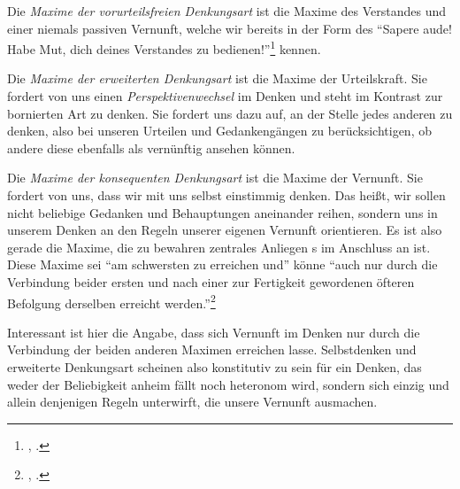 \begin{nummerierung}
 \item Die \emph{Maxime der vorurteilsfreien Denkungsart} ist die Maxime des
 Verstandes und einer niemals passiven Vernunft, welche wir bereits in der
 Form des \enquote{Sapere aude! Habe Mut, dich deines  Verstandes zu
 bedienen!}\footnote{\cite[][A
 481]{Kant:BeantwortungderFrage:WasistAufklaerung?1977},
 \cite[][VIII: 35.6--7]{Kant:GesammelteWerke1900ff.}.} kennen.
 \item Die \emph{Maxime der erweiterten Denkungsart} ist die Maxime der
 Urteilskraft. Sie fordert von uns einen \emph{Perspektivenwechsel} im Denken
 und steht im Kontrast zur bornierten Art zu denken. Sie fordert uns dazu auf,
 an der Stelle jedes anderen zu denken, also bei unseren Urteilen und
 Gedankengängen zu berücksichtigen, ob andere diese ebenfalls als vernünftig
 ansehen können.
 \item Die \emph{Maxime der konsequenten Denkungsart} ist die Maxime der
 Vernunft. Sie fordert von uns, dass wir mit uns selbst einstimmig denken. Das
 heißt, wir sollen nicht beliebige Gedanken und Behauptungen aneinander reihen,
 sondern uns in unserem Denken an den Regeln unserer eigenen Vernunft
 orientieren. Es ist also gerade die Maxime, die zu bewahren zentrales Anliegen
 s im Anschluss an
  ist. Diese
 Maxime sei \enquote{am schwersten zu erreichen und} könne \enquote{auch nur
 durch die Verbindung beider ersten und nach einer zur Fertigkeit gewordenen
 öfteren Befolgung derselben erreicht
 werden.}\footnote{\cite[][\S~40]{Kant:KritikderUrteilskraft2009}, \cite[][V:
 295.15--17]{Kant:GesammelteWerke1900ff.}.}
\end{nummerierung}
Interessant ist hier die Angabe, dass sich Vernunft im Denken nur durch die
Verbindung der beiden anderen Maximen erreichen lasse. Selbstdenken und
erweiterte Denkungsart scheinen also konstitutiv zu sein für ein Denken, das
weder der Beliebigkeit anheim fällt noch heteronom wird, sondern sich einzig
und allein denjenigen Regeln unterwirft, die unsere Vernunft ausmachen.


